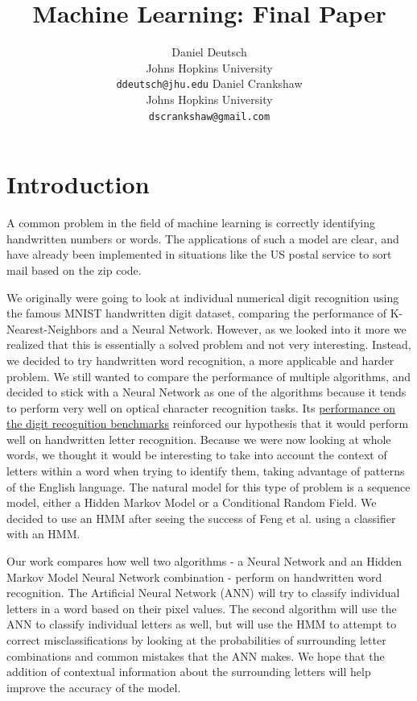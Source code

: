 \documentclass[11pt,letterpaper]{article}
\title{Machine Learning: Final Paper}
\author{Daniel Deutsch\\
  Johns Hopkins University\\
  {\tt ddeutsch@jhu.edu}
  \And
  Daniel Crankshaw \\
  Johns Hopkins University \\
  {\tt dscrankshaw@gmail.com}}
\date{}
\begin{document}
\maketitle

\section{Introduction}

A common problem in the field of machine learning is correctly identifying
handwritten numbers or words. The applications of
such a model are clear, and have already been implemented in situations like
the US postal service to sort mail based on the zip code.

We originally were going to look at individual numerical digit recognition using the famous
MNIST handwritten digit dataset, comparing the performance of K-Nearest-Neighbors and a
Neural Network. However, as we looked into it more we realized that this is essentially a solved
problem and not very interesting. Instead, we decided to try handwritten word recognition,
a more applicable and harder problem. We still wanted to compare the performance of multiple
algorithms, and decided to stick with a Neural Network as one of the algorithms because it tends to
perform very well on optical character recognition tasks. Its \href{http://yann.lecun.com/exdb/mnist/index.html}{performance on the digit recognition benchmarks} reinforced our hypothesis that it would perform well on handwritten letter
recognition. Because we were now looking at whole words, we thought it would be interesting to take
into account the context of letters within a word when trying to identify them, taking advantage of
patterns of the English language. The natural model for this type of problem is a sequence model,
either a Hidden Markov Model or a Conditional Random Field. We decided to use an HMM after seeing
the success of Feng et al.\cite{feng} using a classifier with an HMM.

Our work compares how well two algorithms - a Neural Network and an Hidden Markov Model Neural
Network combination - perform on handwritten word recognition. The Artificial Neural Network (ANN) will
try to classify individual letters in a word based on their pixel values. The second algorithm will
use the ANN to classify individual letters as well, but will use the HMM to attempt to correct
misclassifications by looking at the probabilities of surrounding letter combinations and common
mistakes that the ANN makes. We hope that the addition of contextual information
about the surrounding letters will help improve the accuracy of the model.
\end{document}
